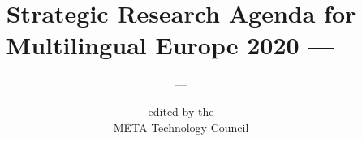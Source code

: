 %                                                                             
%
%
% 

\usepackage{polyglossia}

\title{Strategic Research Agenda for Multilingual Europe 2020 --- ~}


\subtitle{~ --- ~}

\author{
  {\footnotesize edited by the}\\
  META Technology Council
}


\editors{
}

\SpineLText{%
}

\SpineRText{%
}

